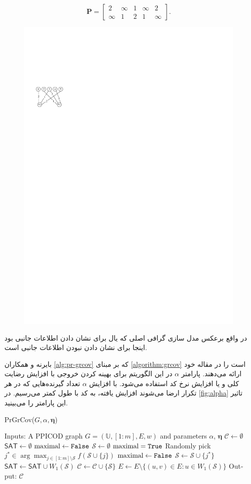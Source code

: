 \begin{example}
\begin{equation*}
	\boldsymbol{P} = 
	\begin{bmatrix}
		2 & \infty & 1 &\infty & 2\\
		\infty & 1 & 2 & 1 & \infty \label{eq:ppicod-instance}
	\end{bmatrix}.
\end{equation*}
\begin{figure}[H]
	\centering
	\includegraphics[width=0.2\linewidth]{figs/chapter4/ppgraph.pdf}
	\caption{}
	\label{fig:ppgraph}
\end{figure}
در واقع برعکس مدل سازی گرافی اصلی که یال برای نشان دادن اطلاعات جانبی بود اینجا برای نشان دادن نبودن اطلاعات جانبی است.
\end{example}
بایرنه و همکاران
\autoref{alg:pr-grcov}
 که بر مبنای 
 \autoref{algorithm:grcov}
  است را در مقاله خود ارائه می‌دهند. پارامتر 
 $\alpha$
 در این الگوریتم برای بهینه کردن خروجی با افزایش رضایت کلی و یا افزایش نرخ کد استفاده می‌‌شود. با افزایش 
 $\alpha$
 تعداد گیرنده‌هایی که در هر تکرار ارضا می‌شوند افزایش یافته، به کد با طول کمتر می‌رسیم. در 
 \autoref{fig:alpha}
 تاثیر این پارامتر را می‌بینید.
\begin{latin}
\begin{algorithm}
	\caption{PrGrCov($G,\alpha,\boldsymbol{\eta}$)}
	\label{alg:pr-grcov}
	\begin{algorithmic}[1]
		\State Inputs: A PPICOD graph $G=(\mathbb{U}, [1:m], E, w)$ and parameters $\alpha$, $\boldsymbol{\eta}$
		\State $\mathcal{C} \gets \emptyset$
		\State $\mathsf{SAT} \gets \emptyset$ 
		\State $\textrm{maximal} \gets \texttt{False}$
		\State $\mathcal{S} \gets \emptyset$
		\State $\textrm{maximal} = \texttt{True}$
		\State Randomly pick $j^* \in \arg \max_{j \in [1:m] \setminus \mathcal{S}} f(\mathcal{S} \cup \{j\})$
		\State $\textrm{maximal} \gets \texttt{False}$
		\State $\mathcal{S} \gets \mathcal{S} \cup \{j^*\}$
		\EndIf
		\EndWhile
		\State $\mathsf{SAT} \gets \mathsf{SAT} \cup W_1(\mathcal{S})$
		\State $\mathcal{C} \gets \mathcal{C} \cup \{\mathcal{S}\}$
		\State $E \gets E \setminus \{ (u,v) \in E: u \in W_1(\mathcal{S})\}$
		\EndWhile
		\State Output: $\mathcal{C}$
	\end{algorithmic}
\end{algorithm}
\end{latin}

